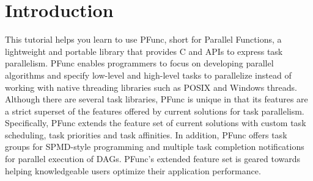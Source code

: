 \section{Introduction}
\label{sec:introduction}

This tutorial helps you learn to use PFunc, short for Parallel Functions, a
lightweight and portable library that provides C and \Cpp{} APIs to express
task parallelism. 
%
PFunc enables programmers to focus on developing parallel algorithms and
specify low-level and high-level tasks to parallelize instead of working with
native threading libraries such as POSIX and Windows threads.
%
Although there are several task libraries, PFunc is unique in that its features
are a strict superset of the features offered by current solutions for task
parallelism.  
%
Specifically, PFunc extends the feature set of current solutions with custom
task scheduling, task priorities and task affinities.
%
In addition, PFunc offers task groups for SPMD-style programming and multiple
task completion notifications for parallel execution of DAGs. 
%
PFunc's extended feature set is geared towards helping knowledgeable users
optimize their application performance. 
%


